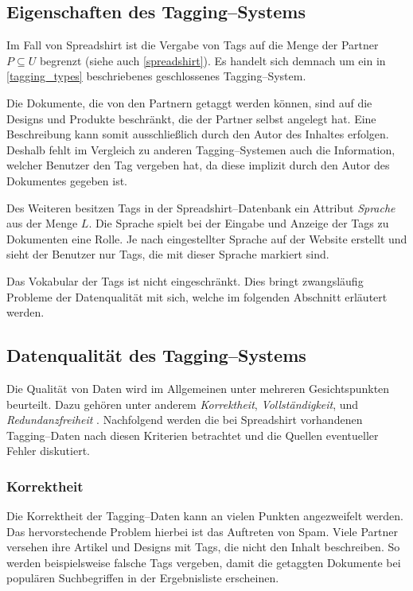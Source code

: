 \subsection{Eigenschaften des Tagging--Systems}
\label{tag_sprd}

Im Fall von Spreadshirt ist die Vergabe von Tags auf die Menge der Partner \(P \subseteq U\) begrenzt (siehe auch \cref{spreadshirt}). Es handelt sich demnach um ein in \cref{tagging_types} beschriebenes geschlossenes Tagging--System.

Die Dokumente, die von den Partnern getaggt werden können, sind auf die Designs und Produkte beschränkt, die der Partner selbst angelegt hat. Eine Beschreibung kann somit ausschließlich durch den Autor des Inhaltes erfolgen. Deshalb fehlt im Vergleich zu anderen Tagging--Systemen auch die Information, welcher Benutzer den Tag vergeben hat, da diese implizit durch den Autor des Dokumentes gegeben ist.

Des Weiteren besitzen Tags in der Spreadshirt--Datenbank ein Attribut \emph{Sprache} aus der Menge \(L\). Die Sprache spielt bei der Eingabe und Anzeige der Tags zu Dokumenten eine Rolle. Je nach eingestellter Sprache auf der Website erstellt und sieht der Benutzer nur Tags, die mit dieser Sprache markiert sind.

Das Vokabular der Tags ist nicht eingeschränkt. Dies bringt zwangsläufig Probleme der Datenqualität mit sich, welche im folgenden Abschnitt erläutert werden.

\subsection{Datenqualität des Tagging--Systems}
\label{quality}

Die Qualität von Daten wird im Allgemeinen unter mehreren Gesichtspunkten beurteilt. Dazu gehören unter anderem \emph{Korrektheit}, \emph{Vollständigkeit}, und \emph{Redundanzfreiheit} \cite[S. 84 f.]{hkp2012}. Nachfolgend werden die bei Spreadshirt vorhandenen Tagging--Daten nach diesen Kriterien betrachtet und die Quellen eventueller Fehler \cite[S. 43 f.]{jo2003} diskutiert.

\subsubsection{Korrektheit}

Die Korrektheit der Tagging--Daten kann an vielen Punkten angezweifelt werden. Das hervorstechende Problem hierbei ist das Auftreten von Spam. Viele Partner versehen ihre Artikel und Designs mit Tags, die nicht den Inhalt beschreiben. So werden beispielsweise falsche Tags vergeben, damit die getaggten Dokumente bei populären Suchbegriffen in der Ergebnisliste erscheinen.

